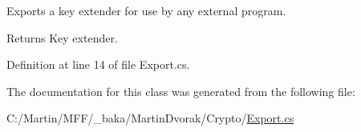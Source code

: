 Exports a key extender for use by any external program. 

\begin{DoxyReturn}{Returns}
Key extender.
\end{DoxyReturn}


Definition at line 14 of file Export.\+cs.



The documentation for this class was generated from the following file\+:\begin{DoxyCompactItemize}
\item 
C\+:/\+Martin/\+M\+F\+F/\+\_\+baka/\+Martin\+Dvorak/\+Crypto/\hyperlink{_export_8cs}{Export.\+cs}\end{DoxyCompactItemize}
